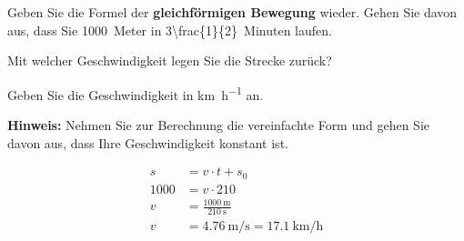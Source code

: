 \documentclass[fontsize=12pt,parskip=half]{scrartcl}
\begin{document}
\begin{exercise}
  Geben Sie die Formel der \textbf{gleichförmigen Bewegung} wieder. Gehen Sie
  davon aus, dass Sie 1000~Meter in
  \SI[parse-numbers=false]{3\frac{1}{2}}{Minuten} laufen.
  \begin{enumerate*}[label=\bfseries\alph*)]
    \item Mit welcher Geschwindigkeit legen Sie die Strecke zurück?
    \item Geben Sie die Geschwindigkeit in \si{\km\per\hour} an.
  \end{enumerate*}
  \textbf{Hinweis:} Nehmen Sie zur Berechnung die vereinfachte Form und gehen
  Sie davon aus, dass Ihre Geschwindigkeit konstant ist.
\end{exercise}
\begin{solution}
  \begin{align*}
    s    &=v\cdot t+s_0 \\
    1000 &=v\cdot 210 \\
    v    &=\frac{\SI{1000}{\m}}{\SI{210}{\second}} \\
    v    &=\SI{4.76}{\m\per\second} = \SI{17.1}{\km\per\hour}
  \end{align*}
\end{solution}
\end{document}
